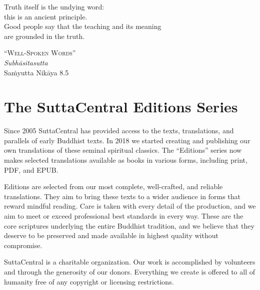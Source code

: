 \documentclass[12pt,openany]{book}%
\newcommand{\blankpage}{
\newpage
\thispagestyle{empty}
\mbox{}
\newpage
}
\newcommand*{\epigraphTranslatedTitle}[1]{\vspace*{.5em}\footnotesize\textsc{#1}\\}%
\newcommand*{\epigraphRootTitle}[1]{\footnotesize\textit{#1}\\}%
\newcommand*{\epigraphReference}[1]{\footnotesize{#1}}%
\begin{document}
\newpage

\setlength{\parindent}{1.5em}%
\newpage

\vspace*{\fill}

\begin{center}
\epigraph{Truth itself is the undying word:\\
this is an ancient principle.\\
Good people say that the teaching and its meaning\\
are grounded in the truth.}
{
\epigraphTranslatedTitle{“Well-Spoken Words”}
\epigraphRootTitle{\textsanskrit{Subhāsitasutta}}
\epigraphReference{\textsanskrit{Saṁyutta} \textsanskrit{Nikāya} 8.5}
}
\end{center}

\vspace*{2in}

\vspace*{\fill}

\blankpage%

\setlength{\parindent}{1em}
%
\tableofcontents
\newpage
\pagestyle{fancy}
%
\chapter*{The SuttaCentral Editions Series}

Since 2005 SuttaCentral has provided access to the texts, translations, and parallels of early Buddhist texts. In 2018 we started creating and publishing our own translations of these seminal spiritual classics. The “Editions” series now makes selected translations available as books in various forms, including print, PDF, and EPUB.

Editions are selected from our most complete, well-crafted, and reliable translations. They aim to bring these texts to a wider audience in forms that reward mindful reading. Care is taken with every detail of the production, and we aim to meet or exceed professional best standards in every way. These are the core scriptures underlying the entire Buddhist tradition, and we believe that they deserve to be preserved and made available in highest quality without compromise.

SuttaCentral is a charitable organization. Our work is accomplished by volunteers and through the generosity of our donors. Everything we create is offered to all of humanity free of any copyright or licensing restrictions. 
\end{document}
